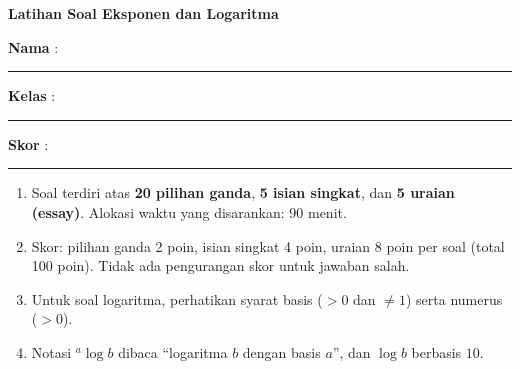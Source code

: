 \documentclass[a4paper,11pt]{article}
\newcommand{\alog}[2]{{}^{#1}\!\log #2}
\newcounter{no}
\begin{document}
\thispagestyle{fancy}

\begin{center}
  {\color{navy}\fontsize{22}{26}\selectfont\bfseries Latihan Soal Eksponen dan Logaritma\par}
\end{center}
\vspace{2pt}
\begin{tcolorbox}[colback=softbg,colframe=navy!40,boxrule=0.6pt,arc=3pt,left=8pt,right=8pt,top=5pt,bottom=5pt]
\noindent\textbf{Nama} : \rule{4.6cm}{0.4pt}\hfill\textbf{Kelas} : \rule{2.2cm}{0.4pt}\hfill\textbf{Skor} : \rule{2.2cm}{0.4pt}
\end{tcolorbox}
\vspace{2pt}
\begin{tcolorbox}[colback=white,colframe=teal,boxrule=0.8pt,arc=3pt,left=8pt,right=8pt,top=4pt,bottom=4pt,title={\bfseries Petunjuk Pengerjaan},coltitle=white,fonttitle=\small]
\small
\begin{enumerate}[leftmargin=1.4em,itemsep=1pt,topsep=1pt]
\item Soal terdiri atas \textbf{20 pilihan ganda}, \textbf{5 isian singkat}, dan \textbf{5 uraian (essay)}. Alokasi waktu yang disarankan: 90 menit.
\item Skor: pilihan ganda 2 poin, isian singkat 4 poin, uraian 8 poin per soal (total 100 poin). Tidak ada pengurangan skor untuk jawaban salah.
\item Untuk soal logaritma, perhatikan syarat basis ($>0$ dan $\neq1$) serta numerus ($>0$).
\item Notasi $\alog{a}{b}$ dibaca ``logaritma $b$ dengan basis $a$'', dan $\log b$ berbasis $10$.
\end{enumerate}
\end{tcolorbox}
\end{document}
